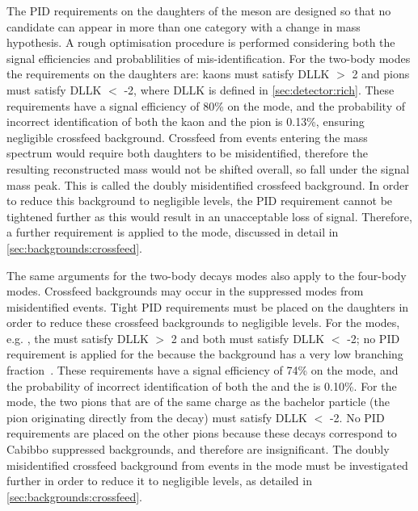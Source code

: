 The PID requirements on the daughters of the \Dz meson are designed so that no  candidate can appear in more than one category with a change in mass hypothesis. A rough optimisation procedure is performed considering both the signal efficiencies and probablilities of mis-identification. For the two-body \Dz modes the requirements on the \Dz daughters are: kaons must satisfy DLLK $>$ 2 and pions must satisfy DLLK $<$ -2, where DLLK is defined in \sect\ref{sec:detector:rich}. These requirements have a signal efficiency of 80\% on the \kpi mode, and the probability of incorrect identification of both the kaon and the pion is 0.13\%, ensuring negligible crossfeed background. Crossfeed from \kpi events entering the \pik mass spectrum would require both \Dz daughters to be misidentified, therefore the resulting reconstructed \Dz mass would not be shifted overall, so fall under the signal \Dz mass peak. This is called the doubly misidentified crossfeed background. In order to reduce this background to negligible levels, the PID requirement cannot be tightened further as this would result in an unacceptable loss of signal. Therefore, a further requirement is applied to the \pik mode, discussed in detail in \sect\ref{sec:backgrounds:crossfeed}.

The same arguments for the two-body \Dz decays modes also apply to the four-body modes. Crossfeed backgrounds may occur in the suppressed \Dz modes from misidentified \kpipipi events. Tight PID requirements must be placed on the \Dz daughters in order to reduce these crossfeed backgrounds to negligible levels. For the \decay{\Dz}{\Kmp\pipm\pimp\pipm} modes, e.g. \decay{\Dz}{\Km\pip\pim\pip}, the \Km must satisfy DLLK $>$ 2 and both \pip must satisfy DLLK $<$ -2; no PID requirement is applied for the \pim because the background \decay{\Dz}{\Kp\Km\Kp\pim} has a very low branching fraction~\cite{PDG2016}. These requirements have a signal efficiency of 74\% on the \kpipipi mode, and the probability of incorrect identification of both the \Km and the \pip is 0.10\%. For the \decay{\Dz}{\pip\pim\pip\pim} mode, the two pions that are of the same charge as the bachelor particle (the pion originating directly from the \Kstarm decay) must satisfy DLLK $<$ -2. No PID requirements are placed on the other pions because these decays correspond to Cabibbo suppressed backgrounds, and therefore are insignificant. The doubly misidentified crossfeed background from \kpipipi events in the \pikpipi mode must be investigated further in order to reduce it to negligible levels, as detailed in \sect\ref{sec:backgrounds:crossfeed}.

